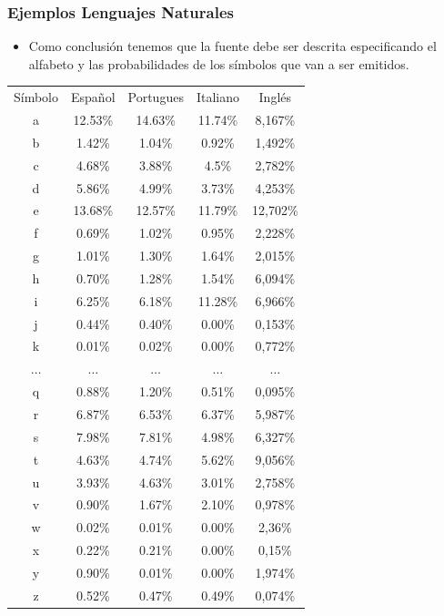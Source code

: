 \documentclass{beamer}
\begin{document}
\begin{frame}\frametitle{Ejemplos Lenguajes Naturales} \footnotesize
\begin{itemize}
\item  Como conclusión tenemos que la fuente debe ser descrita especificando el alfabeto y las probabilidades de los símbolos que van a ser emitidos.
\end{itemize}
 
\tiny
\begin{table}
\center
\begin{tabular}{|c||c|c|c|c|}
\hline
Símbolo	&	Español	&	Portugues	&	Italiano	&	Inglés	\\
a 	&	12.53\% 	&	14.63\% 	&	11.74\% 	&	8,167\%	\\
b 	&	1.42\% 	&	1.04\% 	&	0.92\% 	&	1,492\%	\\
c 	&	4.68\% 	&	3.88\% 	&	4.5\% 	&	2,782\%	\\
d 	&	5.86\% 	&	4.99\% 	&	3.73\% 	&	4,253\%	\\
e 	&	13.68\% 	&	12.57\% 	&	11.79\% 	&	12,702\%	\\
f 	&	0.69\% 	&	1.02\% 	&	0.95\% 	&	2,228\%	\\
g 	&	1.01\% 	&	1.30\% 	&	1.64\% 	&	2,015\%	\\
h 	&	0.70\% 	&	1.28\% 	&	1.54\% 	&	6,094\%	\\
i 	&	6.25\% 	&	6.18\% 	&	11.28\% 	&	6,966\%	\\
j 	&	0.44\% 	&	0.40\% 	&	0.00\% 	&	0,153\%	\\
k 	&	0.01\% 	&	0.02\% 	&	0.00\% 	&	0,772\%	\\
$\ldots$ 	&	$\ldots$ 	&	$\ldots$ 	&	$\ldots$ 	&	$\ldots$	\\
q 	&	0.88\% 	&	1.20\% 	&	0.51\% 	&	0,095\%	\\
r 	&	6.87\% 	&	6.53\% 	&	6.37\% 	&	5,987\%	\\
s 	&	7.98\% 	&	7.81\% 	&	4.98\% 	&	6,327\%	\\
t 	&	4.63\% 	&	4.74\% 	&	5.62\% 	&	9,056\%	\\
u 	&	3.93\% 	&	4.63\% 	&	3.01\% 	&	2,758\%	\\
v 	&	0.90\% 	&	1.67\% 	&	2.10\% 	&	0,978\%	\\
w 	&	0.02\% 	&	0.01\% 	&	0.00\% 	&	2,36\%	\\
x 	&	0.22\% 	&	0.21\% 	&	0.00\% 	&	0,15\%	\\
y 	&	0.90\% 	&	0.01\% 	&	0.00\% 	&	1,974\%	\\
z 	&	0.52\% 	&	0.47\% 	&	0.49\% 	&	0,074\%\\
\hline
\end{tabular}
\end{table}



\end{frame} 
\end{document}
